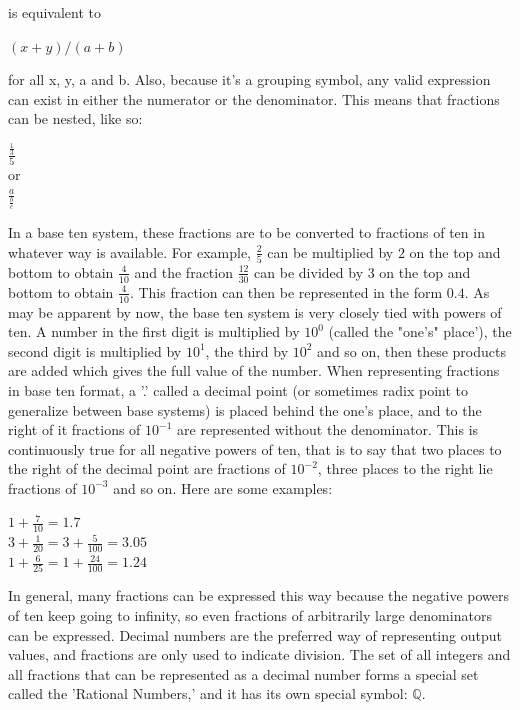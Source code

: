 is equivalent to
\begin{center}
$(x+y)/(a+b)$
\end{center}
for all x, y, a and b. Also, because it's a grouping symbol, any valid expression can exist in either the numerator or the denominator. This means that fractions can be nested, like so:
\begin{center}
$\frac{\frac{1}{3}}{5}$ \\
or \\
$\frac{a}{\frac{b}{c}}$
\end{center}
In a base ten system, these fractions are to be converted to fractions of ten in whatever way is available. For example, $\frac{2}{5}$ can be multiplied by $2$ on the top and bottom to obtain $\frac{4}{10}$ and the fraction $\frac{12}{30}$ can be divided by $3$ on the top and bottom to obtain $\frac{4}{10}$. This fraction can then be represented in the form $0.4$. As may be apparent by now, the base ten system is very closely tied with powers of ten. A number in the first digit is multiplied by $10^0$ (called the "one's" place'), the second digit is multiplied by $10^1$, the third by $10^2$ and so on, then these products are added which gives the full value of the number. When representing fractions in base ten format, a '.' called a decimal point (or sometimes radix point to generalize between base systems) is placed behind the one's place, and to the right of it fractions of $10^{-1}$ are represented without the denominator. This is continuously true for all negative powers of ten, that is to say that two places to the right of the decimal point are fractions of $10^{-2}$, three places to the right lie fractions of $10^{-3}$ and so on. Here are some examples:
\begin{center}
$1+\frac{7}{10}=1.7$ \\
$3+\frac{1}{20}=3+\frac{5}{100}=3.05$ \\
$1+\frac{6}{25}=1+\frac{24}{100}=1.24$ \\
\end{center}
In general, many fractions can be expressed this way because the negative powers of ten keep going to infinity, so even fractions of arbitrarily large denominators can be expressed. Decimal numbers are the preferred way of representing output values, and fractions are only used to indicate division. The set of all integers and all fractions that can be represented as a decimal number forms a special set called the 'Rational Numbers,' and it has its own special symbol: $\mathbb{Q}$.

